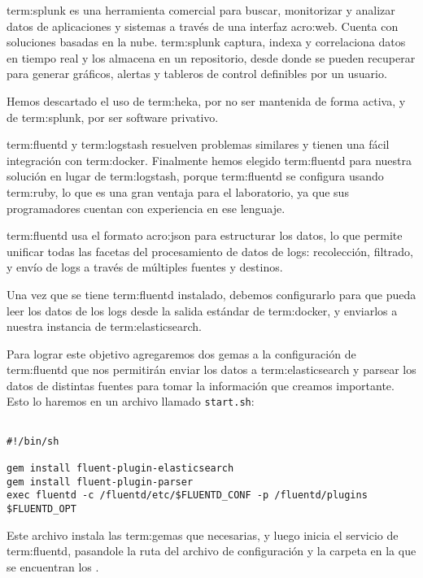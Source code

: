 \gls{term:splunk} es una herramienta comercial para buscar, monitorizar y
analizar datos de aplicaciones y sistemas a través de una interfaz
\gls{acro:web}. Cuenta con soluciones basadas en la nube. \gls{term:splunk}
captura, indexa y correlaciona datos en tiempo real y los almacena en un
repositorio, desde donde se pueden recuperar para generar gráficos, alertas y
tableros de control definibles por un usuario.

Hemos descartado el uso de \gls{term:heka}, por no ser mantenida de forma
activa, y de \gls{term:splunk}, por ser software privativo.

\gls{term:fluentd} y \gls{term:logstash} resuelven problemas similares y tienen
una fácil integración con \gls{term:docker}. Finalmente hemos elegido
\gls{term:fluentd} para nuestra solución en lugar de \gls{term:logstash},
porque \gls{term:fluentd} se configura usando \gls{term:ruby}, lo que es una
gran ventaja para el laboratorio, ya que sus programadores cuentan con
experiencia en ese lenguaje.

\gls{term:fluentd} usa el formato \gls{acro:json} para estructurar los datos,
lo que permite unificar todas las facetas del procesamiento de datos de logs:
recolección, filtrado,  y envío de logs a través de múltiples
fuentes y destinos.

Una vez que se tiene \gls{term:fluentd} instalado, debemos configurarlo para
que pueda leer los datos de los logs desde la salida estándar de
\gls{term:docker}, y enviarlos a nuestra instancia de \gls{term:elasticsearch}.

Para lograr este objetivo agregaremos dos gemas a la configuración de
\gls{term:fluentd} que nos permitirán enviar los datos a
\gls{term:elasticsearch} y parsear los datos de distintas fuentes para tomar la
información que creamos importante. Esto lo haremos en un archivo llamado
\texttt{start.sh}:

\begin{lstlisting}

#!/bin/sh

gem install fluent-plugin-elasticsearch
gem install fluent-plugin-parser
exec fluentd -c /fluentd/etc/$FLUENTD_CONF -p /fluentd/plugins $FLUENTD_OPT

\end{lstlisting}

Este archivo instala las \glspl{term:gema} que necesarias, y luego inicia el
servicio de \gls{term:fluentd}, pasandole la ruta del archivo de configuración
y la carpeta en la que se encuentran los .

